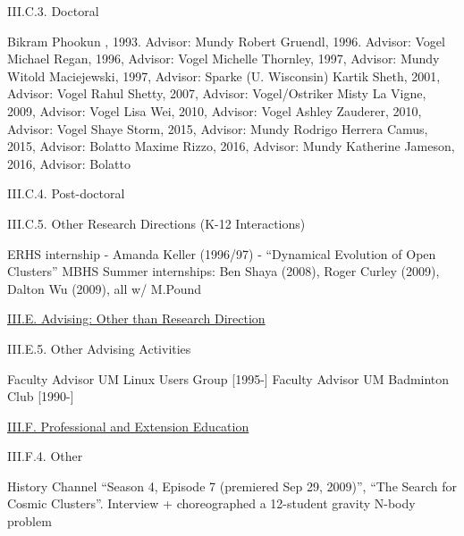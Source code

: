 \documentclass[11pt,letterpaper]{article}
\newcommand{\newi}{\newline\indent}
\begin{document}
III.C.3. Doctoral

Bikram Phookun , 1993. Advisor: Mundy\newi
Robert Gruendl, 1996. Advisor: Vogel\newi
Michael Regan, 1996, Advisor: Vogel\newi
Michelle Thornley, 1997, Advisor: Mundy\newi
Witold Maciejewski, 1997, Advisor: Sparke (U. Wisconsin)\newi
Kartik Sheth, 2001, Advisor: Vogel\newi
Rahul Shetty, 2007, Advisor: Vogel/Ostriker\newi
Misty La Vigne, 2009, Advisor: Vogel\newi
Lisa Wei, 2010, Advisor: Vogel\newi
Ashley Zauderer, 2010, Advisor: Vogel\newi
Shaye Storm, 2015, Advisor: Mundy\newi
Rodrigo Herrera Camus, 2015, Advisor: Bolatto\newi
Maxime Rizzo, 2016, Advisor: Mundy\newi
Katherine Jameson, 2016, Advisor: Bolatto\newi
                
III.C.4. Post-doctoral


III.C.5. Other Research Directions (K-12 Interactions)

ERHS internship - Amanda Keller (1996/97) - ``Dynamical Evolution of  Open Clusters''\newi
MBHS Summer internships: Ben Shaya (2008), Roger Curley (2009), Dalton Wu  (2009), all w/ M.Pound\newi






\underline{III.E. Advising: Other than Research Direction}






III.E.5. Other Advising Activities

Faculty Advisor UM Linux Users Group [1995-]\newi
Faculty Advisor UM Badminton Club [1990-]\newi



\underline{III.F. Professional and Extension Education}




III.F.4. Other

History Channel ``Season 4, Episode 7 (premiered Sep 29, 2009)'',
``The Search for Cosmic Clusters''. Interview + choreographed a 12-student gravity N-body problem
\end{document}
